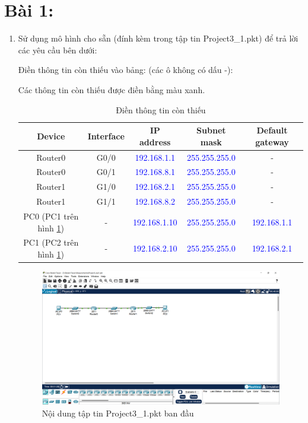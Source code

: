 \section{Bài 1:}
\begin{enumerate}
\bf
\item Sử dụng mô hình cho sẵn (đính kèm trong tập tin Project3{\_}1.pkt) để trả lời các yêu cầu bên dưới:

\rm Điền thông tin còn thiếu vào bảng: (các ô không có dấu -):

Các thông tin còn thiếu được điền bằng màu xanh.
\begin{table}[H]
\begin{center}
\begin{tabular}{|c|c|c|c|c|}
\hline
\textbf{Device}&\textbf{Interface}&\textbf{IP address}&\textbf{Subnet mask}&\textbf{Default gateway}\\
\hline
Router0&G0/0&\textcolor{blue}{192.168.1.1}&\textcolor{blue}{255.255.255.0}&-\\
\hline
Router0&G0/1&\textcolor{blue}{192.168.8.1}&\textcolor{blue}{255.255.255.0}&-\\
\hline
Router1&G1/0&\textcolor{blue}{192.168.2.1}&\textcolor{blue}{255.255.255.0}&-\\
\hline
Router1&G1/1&\textcolor{blue}{192.168.8.2}&\textcolor{blue}{255.255.255.0}&-\\
\hline
PC0 (PC1 trên hình \ref{fig1.1})&-&\textcolor{blue}{192.168.1.10}&\textcolor{blue}{255.255.255.0}&\textcolor{blue}{192.168.1.1}\\
\hline
PC1 (PC2 trên hình \ref{fig1.1})&-&\textcolor{blue}{192.168.2.10}&\textcolor{blue}{255.255.255.0}&\textcolor{blue}{192.168.2.1}\\
\hline
\end{tabular}
\caption{Điền thông tin còn thiếu}
\end{center}
\end{table}


\begin{figure}[H]
\begin{center}
\includegraphics[scale=0.5]{../figures/p1/p1-prob}
\end{center}
\caption{Nội dung tập tin Project3{\_}1.pkt ban đầu}
\label{fig1.1}
\end{figure}


\end{enumerate}
